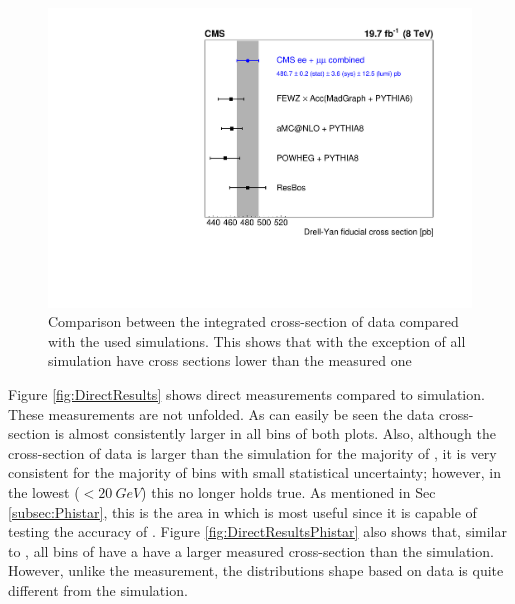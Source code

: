 \begin{figure}
    \centering
    \includegraphics[width=\linewidth]{figures/Results/sigma_fid.pdf}
    \caption[Integrated cross-section]{Comparison between the integrated cross-section of data compared with the used simulations. This shows that with the exception of \RESBOS all simulation have cross sections lower than the measured one}
    \label{fig:Integrated}
\end{figure}



Figure \ref{fig:DirectResults} shows direct measurements compared to simulation. These measurements are not unfolded. As can easily be seen the data cross-section is almost consistently larger in all bins of both plots. Also, although the cross-section of data is larger than the simulation for the majority of \bosonpt, it is very consistent for the majority of bins with small statistical uncertainty; however, in the lowest \bosonpt ($<\SI{20}{GeV}$) this no longer holds true. As mentioned in Sec \ref{subsec:Phistar}, this is the area in which \phistar is most useful since it is capable of testing the accuracy of \bosonpt. Figure \ref{fig:DirectResultsPhistar} also shows that, similar to \bosonpt, all bins of \phistar have a have a larger measured \phistar cross-section than the simulation. However, unlike the \bosonpt measurement, the \phistar distributions shape based on data is quite different from the simulation.

